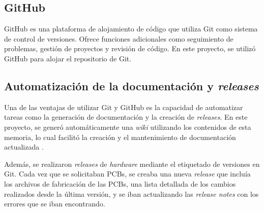 \subsection{GitHub}
GitHub es una plataforma de alojamiento de código que utiliza Git como sistema de control de versiones. Ofrece funciones adicionales como seguimiento de problemas, gestión de proyectos y revisión de código. En este proyecto, se utilizó GitHub para alojar el repositorio de Git.

\subsection{Automatización de la documentación y \textit{releases}}
Una de las ventajas de utilizar Git y GitHub es la capacidad de automatizar tareas como la generación de documentación y la creación de \textit{releases}. En este proyecto, se generó automáticamente una \textit{wiki} utilizando los contenidos de esta memoria, lo cual facilitó la creación y el mantenimiento de documentación actualizada \cite{InverterWiki}.

Además, se realizaron \textit{releases} de \textit{hardware} mediante el etiquetado de versiones en Git. Cada vez que se solicitaban PCBs, se creaba una nueva \textit{release} que incluía los archivos de fabricación de las PCBs, una lista detallada de los cambios realizados desde la última versión, y se iban actualizando las \textit{release notes} con los errores que se iban encontrando.


